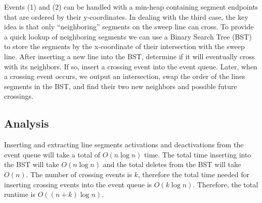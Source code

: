 \documentclass{article}
\begin{document}
Events (1) and (2) can be handled with a min-heap containing segment endpoints
that are ordered by their y-coordinates.  In dealing with the third case, the
key idea is that only ``neighboring'' segments on the sweep line can cross.  To
provide a quick lookup of neighboring segments we can use a Binary Search Tree
(BST) to store the segments by the x-coordinate of their intersection with the
sweep line.  After inserting a new line into the BST, determine if it will
eventually cross with its neighbors.  If so, insert a crossing event into the
event queue.  Later, when a crossing event occurs, we output an intersection, 
swap the order of the lines segments in the BST, and find their two new 
neighbors and possible future crossings.

\subsection{Analysis}

Inserting and extracting line segments activations and deactivations from the 
event queue will take a total of $O(n \log{n})$ time.  The total time inserting 
into the BST will take $O(n \log{n})$ and the total deletes from the BST will 
take $O(n)$.  The number of crossing events is $k$, therefore the total time
needed for inserting crossing events into the event queue is $O(k \log{n})$. 
Therefore, the total runtime is $O((n+k) \log{n})$.
\end{document}
